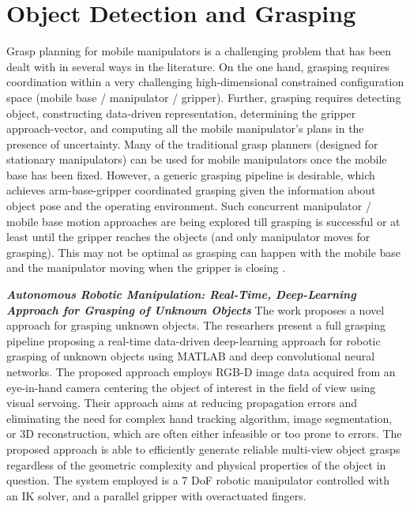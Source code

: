 \onehalfspacing


\section{Object Detection and Grasping}

Grasp planning for mobile manipulators is a challenging problem that has been
dealt with in several ways in the literature. On the one hand, grasping requires coordination
within a very challenging high-dimensional constrained configuration space (mobile base /
manipulator / gripper). Further, grasping requires detecting object, constructing data-driven
representation, determining the gripper approach-vector, and computing all the mobile manipulator's
plans in the presence of uncertainty. Many of the traditional grasp planners (designed for stationary
manipulators) can be used for mobile manipulators once the mobile base has been fixed.
However, a generic grasping pipeline is desirable, which achieves arm-base-gripper
coordinated grasping given the information about object pose and
the operating environment. Such concurrent manipulator / mobile base motion approaches are being
explored till grasping is successful or at least until the gripper reaches the
objects (and only manipulator moves for grasping). This may not be optimal as grasping can happen
with the mobile base and the manipulator moving when the gripper is closing \cite{thakar2023survey}.

\textbf{\textit{Autonomous Robotic Manipulation: Real-Time, Deep-Learning
Approach for Grasping of Unknown Objects}} \quad
The work \cite{sayour2022unknowngrasping} proposes a novel approach for grasping unknown objects.
The researhers present a full grasping pipeline proposing a real-time data-driven 
deep-learning approach for robotic grasping of unknown objects using MATLAB and 
deep convolutional neural networks. The proposed approach employs RGB-D image data
acquired from an eye-in-hand camera centering the object of interest in the field of
view using visual servoing. Their approach aims at reducing propagation errors
and eliminating the need for complex hand tracking algorithm, image segmentation,
or 3D reconstruction, which are often either infeasible or too prone to errors.
The proposed approach is able to efficiently generate reliable multi-view object grasps 
regardless of the geometric complexity and physical properties of the object in question.
The system employed is a 7 DoF robotic manipulator controlled with an IK solver,
and a parallel gripper with overactuated fingers.

